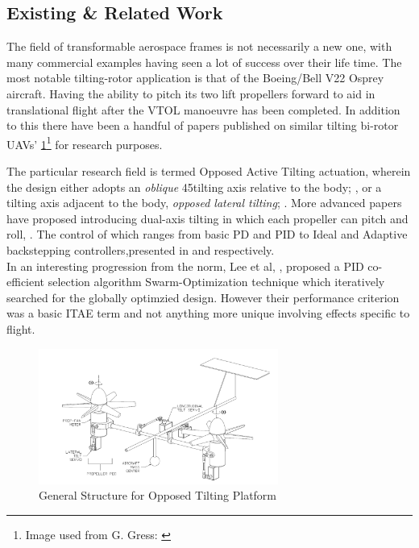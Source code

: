 \subsection{Existing \& Related Work}
\label{subsec:intro.lit.related}
The field of transformable aerospace frames is not necessarily a new one, with many commercial examples having seen a lot of success over their life time. The most notable tilting-rotor application is that of the Boeing/Bell V22 Osprey aircraft. Having the ability to pitch its two lift propellers forward to aid in translational flight after the VTOL manoeuvre has been completed. In addition to this there have been a handful of papers published on similar tilting bi-rotor UAVs' \ref{fig:dualaxistilt}\footnote{Image used from G. Gress: \cite{gres2007}} for research purposes.
\par
The particular research field is termed Opposed Active 
Tilting actuation, wherein the design either adopts an \emph{oblique} 45\textdegree tilting axis relative to the body; \cite{obliquepitch,tiltrotorcontrol,passiveobliquetilting}, or a tilting axis adjacent to the body, \emph{opposed lateral tilting}; \cite{smalltwotilting,tiltrotorUAV}. More advanced papers have proposed introducing dual-axis tilting in which each propeller can pitch and roll, \cite{gres2007,opposedlateraldualaxis}. The control of which ranges from basic PD \cite{obliquepitch} and PID \cite{tiltrotorUAV} to Ideal and Adaptive backstepping controllers,presented in \cite{smalltwotilting} and \cite{adaptivebackstep} respectively.
\\
In an interesting progression from the norm, Lee et al,  \cite{autopilotPSO}, proposed a PID co-efficient selection algorithm Swarm-Optimization technique which iteratively searched for the globally optimzied design. However their performance criterion was a basic ITAE term and not anything more unique involving effects specific to flight. 
\\
\begin{figure}[htbp]
\centering
\includegraphics[width=0.7\textwidth]{figs/dualaxistilt}
\caption{General Structure for Opposed Tilting Platform}
\label{fig:dualaxistilt}
\end{figure}
